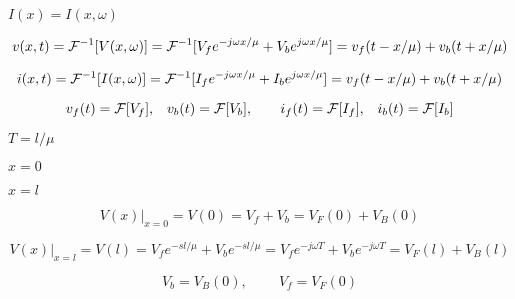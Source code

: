 {\newpage\clearpage
{}%
$I(x)=I(x,\omega)$%
\lthtmlinlinemathZ
\lthtmlcheckvsize\clearpage}

{\newpage\clearpage
{}%
\begin{displaymath}  v(x,t)={\cal F}^{-1}[V(x,\omega)]={\cal F}^{-1}[V_f e^{-j\omega x/\mu}+V_b e^{j\omega x/\mu}]
=v_f(t-x/\mu)+v_b(t+x/\mu) 
\end{displaymath}%
\lthtmldisplayZ
\lthtmlcheckvsize\clearpage}

{\newpage\clearpage
{}%
\begin{displaymath}  i(x,t)={\cal F}^{-1}[I(x,\omega)]={\cal F}^{-1}[I_f e^{-j\omega x/\mu}+I_b e^{j\omega x/\mu}]
  =v_f(t-x/\mu)+v_b(t+x/\mu)
\end{displaymath}%
\lthtmldisplayZ
\lthtmlcheckvsize\clearpage}

{\newpage\clearpage
{}%
\begin{displaymath} v_f(t)={\cal F}[V_f],\;\;\;v_b(t)={\cal F}[V_b],\;\;\;\;\;\;\;
   i_f(t)={\cal F}[I_f],\;\;\;i_b(t)={\cal F}[I_b] \end{displaymath}%
\lthtmldisplayZ
\lthtmlcheckvsize\clearpage}

{\newpage\clearpage
{}%
$T=l/\mu$%
\lthtmlinlinemathZ
\lthtmlcheckvsize\clearpage}

{\newpage\clearpage
{}%
$x=0$%
\lthtmlinlinemathZ
\lthtmlcheckvsize\clearpage}

{\newpage\clearpage
{}%
$x=l$%
\lthtmlinlinemathZ
\lthtmlcheckvsize\clearpage}

{\newpage\clearpage
{}%
\begin{displaymath} V(x)\big|_{x=0}=V(0)=V_f+V_b=V_F(0)+V_B(0) \end{displaymath}%
\lthtmldisplayZ
\lthtmlcheckvsize\clearpage}

{\newpage\clearpage
{}%
\begin{displaymath} V(x)\big|_{x=l}=V(l)=V_f e^{-sl/\mu}+V_b e^{-sl/\mu}
=V_f e^{-j\omega T}+V_b e^{-j\omega T}=V_F(l)+V_B(l)
\end{displaymath}%
\lthtmldisplayZ
\lthtmlcheckvsize\clearpage}

{\newpage\clearpage
{}%
\begin{displaymath}	V_b=V_B(0),\;\;\;\;\;\;\;\;V_f=V_F(0)	\end{displaymath}%
\lthtmldisplayZ
\lthtmlcheckvsize\clearpage}


